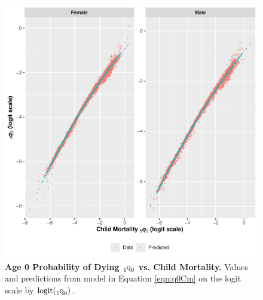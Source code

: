 \documentclass[11pt]{article}
\newcommand{\qf}{\tensor*[_5]{\mbox{q}}{_0}}
\newcommand{\qoz}{\tensor*[_1]{\mbox{q}}{_0}}
\newcommand{\logit}{\mbox{logit}}
\begin{document}
\begin{appendices}
\begin{figure}[htbp]
   \centering
   \includegraphics[width=0.94\linewidth]{../figures/fig2-3.pdf} 
   \captionsetup{format=plain,font=normalsize,margin=0cm,justification=justified}
   \caption{\textbf{Age 0 Probability of Dying $\qoz$ vs. Child Mortality.} Values and predictions from model in Equation \ref{eqn:q0Cm} on the logit scale by $\logit(\qf)$.}
   \label{fig:q0Child}
\end{figure}


\end{appendices}
\end{document}
